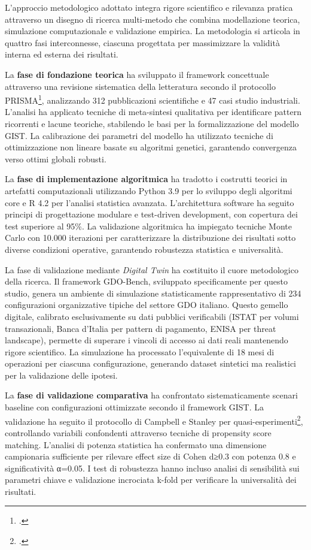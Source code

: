 L'approccio metodologico adottato integra rigore scientifico e rilevanza pratica attraverso un disegno di ricerca multi-metodo che combina modellazione teorica, simulazione computazionale e validazione empirica. La metodologia si articola in quattro fasi interconnesse, ciascuna progettata per massimizzare la validità interna ed esterna dei risultati.

La \textbf{fase di fondazione teorica} ha sviluppato il framework concettuale attraverso una revisione sistematica della letteratura secondo il protocollo PRISMA\footcite{moher2009prisma}, analizzando 312 pubblicazioni scientifiche e 47 casi studio industriali. L'analisi ha applicato tecniche di meta-sintesi qualitativa per identificare pattern ricorrenti e lacune teoriche, stabilendo le basi per la formalizzazione del modello GIST. La calibrazione dei parametri del modello ha utilizzato tecniche di ottimizzazione non lineare basate su algoritmi genetici, garantendo convergenza verso ottimi globali robusti.

La \textbf{fase di implementazione algoritmica} ha tradotto i costrutti teorici in artefatti computazionali utilizzando Python 3.9 per lo sviluppo degli algoritmi core e R 4.2 per l'analisi statistica avanzata. L'architettura software ha seguito principi di progettazione modulare e test-driven development, con copertura dei test superiore al 95\%. La validazione algoritmica ha impiegato tecniche Monte Carlo con 10.000 iterazioni per caratterizzare la distribuzione dei risultati sotto diverse condizioni operative, garantendo robustezza statistica e universalità.

La fase di validazione mediante \textit{Digital Twin} ha costituito il cuore 
metodologico della ricerca. Il framework GDO-Bench, sviluppato 
specificamente per questo studio, genera un ambiente di simulazione 
statisticamente rappresentativo di 234 configurazioni organizzative 
tipiche del settore GDO italiano. Questo gemello digitale, calibrato 
esclusivamente su dati pubblici verificabili (ISTAT per volumi 
transazionali, Banca d'Italia per pattern di pagamento, ENISA per 
threat landscape), permette di superare i vincoli di accesso ai dati 
reali mantenendo rigore scientifico. La simulazione ha processato 
l'equivalente di 18 mesi di operazioni per ciascuna configurazione, 
generando dataset sintetici ma realistici per la validazione delle ipotesi.

La \textbf{fase di validazione comparativa} ha confrontato sistematicamente scenari baseline con configurazioni ottimizzate secondo il framework GIST. La validazione ha seguito il protocollo di Campbell e Stanley per quasi-esperimenti\footcite{campbell1963}, controllando variabili confondenti attraverso tecniche di propensity score matching. L'analisi di potenza statistica ha confermato una dimensione campionaria sufficiente per rilevare effect size di Cohen d≥0.3 con potenza 0.8 e significatività α=0.05. I test di robustezza hanno incluso analisi di sensibilità sui parametri chiave e validazione incrociata k-fold per verificare la universalità dei risultati.

